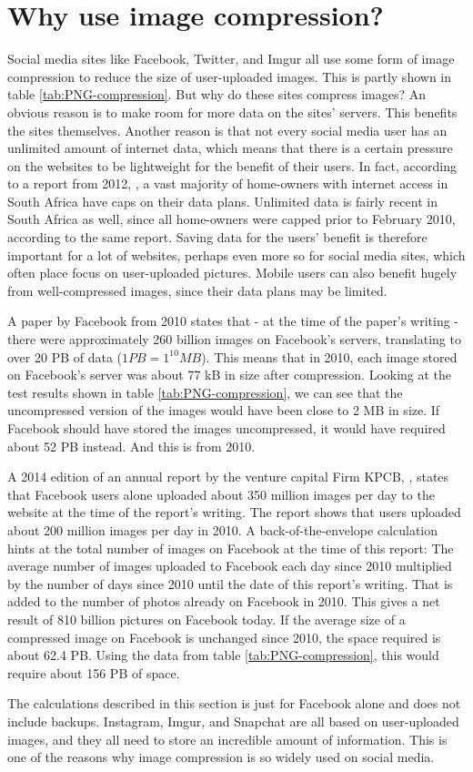 \section{Why use image compression?}
Social media sites like Facebook, Twitter, and Imgur all use some form of image compression to reduce the size of user-uploaded images.
This is partly shown in table \ref{tab:PNG-compression}.
But why do these sites compress images?
An obvious reason is to make room for more data on the sites' servers.
This benefits the sites themselves.
Another reason is that not every social media user has an unlimited amount of internet data, which means that there is a certain pressure on the websites to be lightweight for the benefit of their users.
In fact, according to a report from 2012, \citep{chetty_2012}, a vast majority of home-owners with internet access in South Africa have caps on their data plans.
Unlimited data is fairly recent in South Africa as well, since all home-owners were capped prior to February 2010, according to the same report.
Saving data for the users' benefit is therefore important for a lot of websites, perhaps even more so for social media sites, which often place focus on user-uploaded pictures. Mobile users can also benefit hugely from well-compressed images, since their data plans may be limited.

A paper by Facebook from 2010 \citep{beaver2010} states that - at the time of the paper's writing - there were approximately 260 billion images on Facebook's servers, translating to over 20 PB of data ($1 PB = 1^{10} MB$).
This means that in 2010, each image stored on Facebook's server was about 77 kB in size after compression.
Looking at the test results shown in table \ref{tab:PNG-compression}, we can see that the uncompressed version of the images would have been close to 2 MB in size.
If Facebook should have stored the images uncompressed, it would have required about 52 PB instead.
And this is from 2010.

A 2014 edition of an annual report by the venture capital Firm KPCB, \citep{meeker2014internet}, states that Facebook users alone uploaded about
350 million images per day to the website at the time of the report's writing.
The report shows that users uploaded about 200 million images per day in 2010.
A back-of-the-envelope calculation hints at the total number of images on Facebook at the time of this report:
The average number of images uploaded to Facebook each day since 2010 multiplied by the number of days since 2010 until the date of this report's writing.
That is added to the number of photos already on Facebook in 2010.
This gives a net result of 810 billion pictures on Facebook today.
If the average size of a compressed image on Facebook is unchanged since 2010, the space required is about 62.4 PB.
Using the data from table \ref{tab:PNG-compression}, this would require about 156 PB of space.

The calculations described in this section is just for Facebook alone and does not include backups. Instagram, Imgur, 
and Snapchat are all based on user-uploaded images, and they all need to store an incredible amount of information.
This is one of the reasons why image compression is so widely used on social media.
